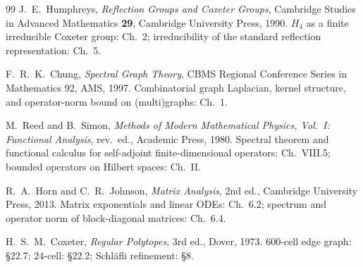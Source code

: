 \documentclass[11pt]{article}
\theoremstyle{definition}
\begin{document}
\begin{thebibliography}{99}
J.~E.~Humphreys, \emph{Reflection Groups and Coxeter Groups},
Cambridge Studies in Advanced Mathematics \textbf{29}, Cambridge
University Press, 1990.
$H_4$ as a finite irreducible Coxeter group: Ch.~2;
irreducibility of the standard reflection representation: Ch.~5.

F.~R.~K.~Chung, \emph{Spectral Graph Theory}, CBMS Regional
Conference Series in Mathematics 92, AMS, 1997.
Combinatorial graph Laplacian, kernel structure, and
operator-norm bound on (multi)graphs: Ch.~1.

M.~Reed and B.~Simon, \emph{Methods of Modern Mathematical
Physics, Vol.~I: Functional Analysis}, rev.\ ed., Academic
Press, 1980.
Spectral theorem and functional calculus for self-adjoint
finite-dimensional operators: Ch.~VIII.5; bounded operators on Hilbert
spaces: Ch.~II.

R.~A.~Horn and C.~R.~Johnson, \emph{Matrix Analysis}, 2nd ed.,
Cambridge University Press, 2013.
Matrix exponentials and linear ODEs: Ch.~6.2; spectrum and
operator norm of block-diagonal matrices: Ch.~6.4.

H.~S.~M.~Coxeter, \emph{Regular Polytopes}, 3rd ed., Dover, 1973.
$600$-cell edge graph: \S 22.7;
$24$-cell: \S 22.2;
Schl\"{a}fli refinement: \S 8.

\end{thebibliography}
\end{document}
